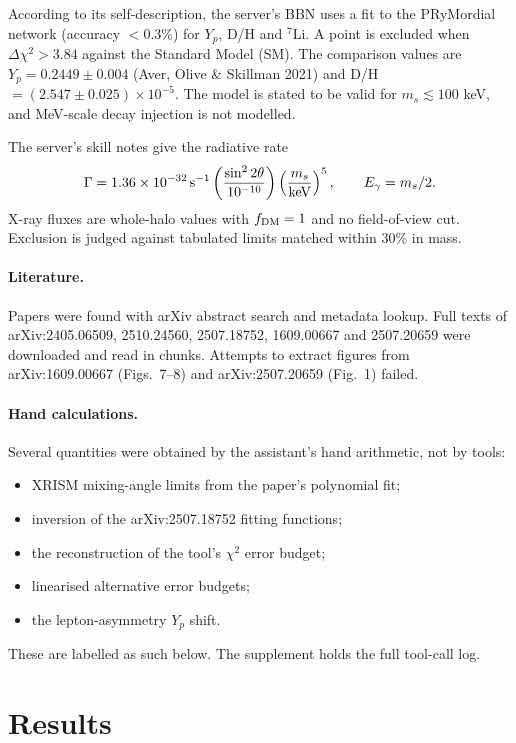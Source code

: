 \documentclass[11pt,a4paper]{article}
\begin{document}
According to its self-description, the server's BBN uses a fit to the PRyMordial network (accuracy $<0.3\%$) for $Y_p$, D/H and $^7$Li. A point is excluded when $\Delta\chi^2>3.84$ against the Standard Model (SM). The comparison values are $Y_p=0.2449\pm0.004$ (Aver, Olive \& Skillman 2021) and D/H$=(2.547\pm0.025)\times10^{-5}$. The model is stated to be valid for $m_s\lesssim100$ keV, and MeV-scale decay injection is not modelled.

The server's skill notes give the radiative rate
\begin{equation}
\Gamma=1.36\times10^{-32}\,{\rm s^{-1}}\left(\frac{\sin^2 2\theta}{10^{-10}}\right)\left(\frac{m_s}{\rm keV}\right)^5 ,\qquad E_\gamma=m_s/2 .
\end{equation}
X-ray fluxes are whole-halo values with $f_{\rm DM}=1$ and no field-of-view cut. Exclusion is judged against tabulated limits matched within 30\% in mass.

\paragraph{Literature.} Papers were found with arXiv abstract search and metadata lookup. Full texts of arXiv:2405.06509, 2510.24560, 2507.18752, 1609.00667 and 2507.20659 were downloaded and read in chunks. Attempts to extract figures from arXiv:1609.00667 (Figs.~7--8) and arXiv:2507.20659 (Fig.~1) failed.

\paragraph{Hand calculations.} Several quantities were obtained by the assistant's hand arithmetic, not by tools:
\begin{itemize}
\item XRISM mixing-angle limits from the paper's polynomial fit;
\item inversion of the arXiv:2507.18752 fitting functions;
\item the reconstruction of the tool's $\chi^2$ error budget;
\item linearised alternative error budgets;
\item the lepton-asymmetry $Y_p$ shift.
\end{itemize}
These are labelled as such below. The supplement holds the full tool-call log.

\section{Results}
\end{document}

